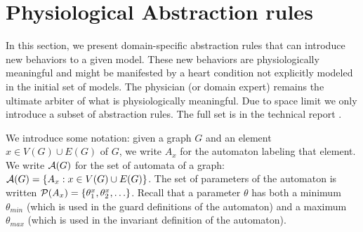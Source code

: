 \section{Physiological Abstraction rules}
\label{abstractionRules}
In this section, we present domain-specific abstraction rules that can introduce new behaviors to a given model. 
These new behaviors are physiologically meaningful and might be manifested by a heart condition not explicitly modeled in the initial set of models.
The physician (or domain expert) remains the ultimate arbiter of what is physiologically meaningful.
Due to space limit we only introduce a subset of abstraction rules. 
The full set is in the technical report \cite{regar_tech}.

We introduce some notation: given a graph $G$ and an element $x \in V(G) \cup E(G)$ of $G$, we write $A_x$ for the automaton labeling that element.
We write $\mathcal{A}(G)$ for the set of automata of a graph: $\mathcal{A}(G) = \{A_x : x \in V(G) \cup E(G)\}$.
The set of parameters of the automaton is written $\mathcal{P}(A_x) = \{\theta_1^x,\theta_2^x,\ldots\}$. 
Recall that a parameter $\theta$ has both a minimum $\theta_{min}$ (which is used in the guard definitions of the automaton) and a maximum $\theta_{max}$ (which is used in the invariant definition of the automaton).

%
%


